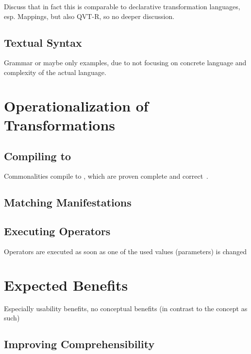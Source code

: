 Discuss that in fact this is comparable to declarative transformation languages, esp. Mappings, but also QVT-R, so no deeper discussion.



\subsection{Textual Syntax}

Grammar or maybe only examples, due to not focusing on concrete language and complexity of the actual language.


\section{Operationalization of Transformations}

\subsection{Compiling to \reactions}
Commonalities compile to \reactions, which are proven complete and correct~\cite{kramer2017a}.


\subsection{Matching Manifestations}

\subsection{Executing Operators}

Operators are executed as soon as one of the used values (parameters) is changed


\section{Expected Benefits}

Especially usability benefits, no conceptual benefits (in contrast to the concept as such)

\subsection{Improving Comprehensibility}

